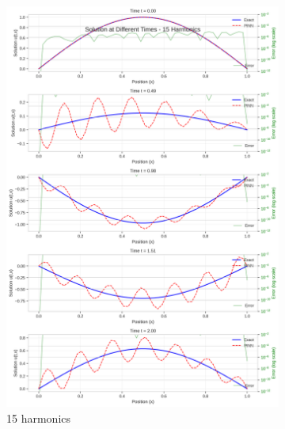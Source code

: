 \begin{figure}[H]
    \centering
    \begin{subfigure}[b]{0.32\textwidth}
        \centering
        \includegraphics[width=\textwidth]{figures/time_slices_15h.png}
        \caption{15 harmonics}
    \end{subfigure}
    \hfill
    \begin{subfigure}[b]{0.32\textwidth}
        \centering

\end{subfigure}
\end{figure}
